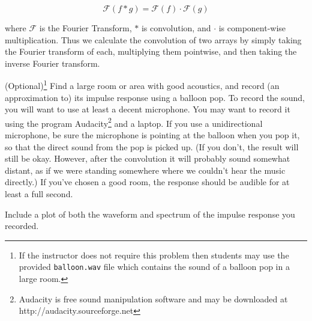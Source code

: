 \[\mathcal{F}(f \ast g) = \mathcal{F}(f)\cdot\mathcal{F}(g)\]

where $\mathcal{F}$ is the Fourier Transform, $\ast$ is convolution, and $\cdot$ is component-wise multiplication.
Thus we calculate the convolution of two arrays by simply taking the Fourier transform of each, multiplying them pointwise, and then taking the inverse Fourier transform.

\begin{problem}
(Optional)\footnote{If the instructor does not require this problem then students may use the provided \texttt{balloon.wav} file which contains the sound of a balloon pop in a large room.} Find a large room or area with good acoustics, and record (an approximation to) its impulse response using a balloon pop.
To record the sound, you will want to use at least a decent microphone.
You may want to record it using the program Audacity\footnote{Audacity is free sound manipulation software and may be downloaded at http://audacity.sourceforge.net} and a laptop.
If you use a unidirectional microphone, be sure the microphone is pointing at the balloon when you pop it, so that the direct sound from the pop is picked up.
(If you don't, the result will still be okay.
However, after the convolution it will probably sound somewhat distant, as if we were standing somewhere where we couldn't hear the music directly.)
If you've chosen a good room, the response should be audible for at least a full second.

Include a plot of both the waveform and spectrum of the impulse response you recorded.
\end{problem}

